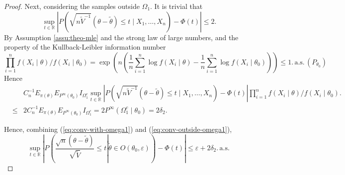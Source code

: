 \documentclass[oneside,english]{amsbook}
\numberwithin{section}{chapter}
\numberwithin{equation}{section}
\numberwithin{figure}{section}
\theoremstyle{plain}
\theoremstyle{plain}
\theoremstyle{definition}
\theoremstyle{plain}
\theoremstyle{plain}
\theoremstyle{remark}
\theoremstyle{definition}
\theoremstyle{definition}
\newcommand{\ascv}{\,\mathrm{a.s.}\,}
\begin{document}
\begin{proof}
Next, considering the samples outside $\Omega_{1}$. It is trivial
that 
\[
\sup_{t\in\mathbb{R}}\left|P\left(\sqrt{n\tilde{V}^{-1}}\left(\theta-\tilde{\theta}\right)\le t\mid X_{1},\ldots,X_{n}\right)-\Phi\left(t\right)\right|\le2.
\]
By Assumption \ref{assu:theo-mle} and the strong law of large numbers,
and the property of the Kullback-Leibler information number 
\[
\prod_{i=1}^{n}f\left(X_{i}\mid\theta\right)/f\left(X_{i}\mid\theta_{0}\right)=\exp\left(n\left(\frac{1}{n}\sum_{i=1}^{n}\log f\left(X_{i}\mid\theta\right)-\frac{1}{n}\sum_{i=1}^{n}\log f\left(X_{i}\mid\theta_{0}\right)\right)\right)\le1.\ascv\left(P_{\theta_{0}}\right)
\]
Hence
\begin{eqnarray}
 &  & C_{n}^{-1}E_{\pi\left(\theta\right)}E_{P^{\infty}\left(\theta_{0}\right)}I_{\Omega_{1}^{c}}\sup_{t\in\mathbb{R}}\left|P\left(\sqrt{n\tilde{V}^{-1}}\left(\theta-\tilde{\theta}\right)\le t\mid X_{1},\ldots,X_{n}\right)-\Phi\left(t\right)\right|\prod_{i=1}^{n}f\left(X_{i}\mid\theta\right)/f\left(X_{i}\mid\theta_{0}\right).\nonumber \\
 & \le & 2C_{n}^{-1}E_{\pi\left(\theta\right)}E_{P^{\infty}\left(\theta_{0}\right)}I_{\Omega_{1}^{c}}=2P^{\infty}\left(\Omega_{1}^{c}\mid\theta_{0}\right)=2\delta_{2}.\label{eq:conv-outside-omega1}
\end{eqnarray}


Hence, combining (\ref{eq:conv-with-omega1}) and (\ref{eq:conv-outside-omega1}),
\[
\sup_{t\in\mathbb{R}}\left|P\left(\left.\frac{\sqrt{n}\left(\theta-\tilde{\theta}\right)}{\sqrt{\tilde{V}}}\le t\right|\tilde{\theta}\in O\left(\theta_{0},\varepsilon\right)\right)-\Phi\left(t\right)\right|\le\varepsilon+2\delta_{2}.\ascv
\]

\end{proof}
\end{document}
